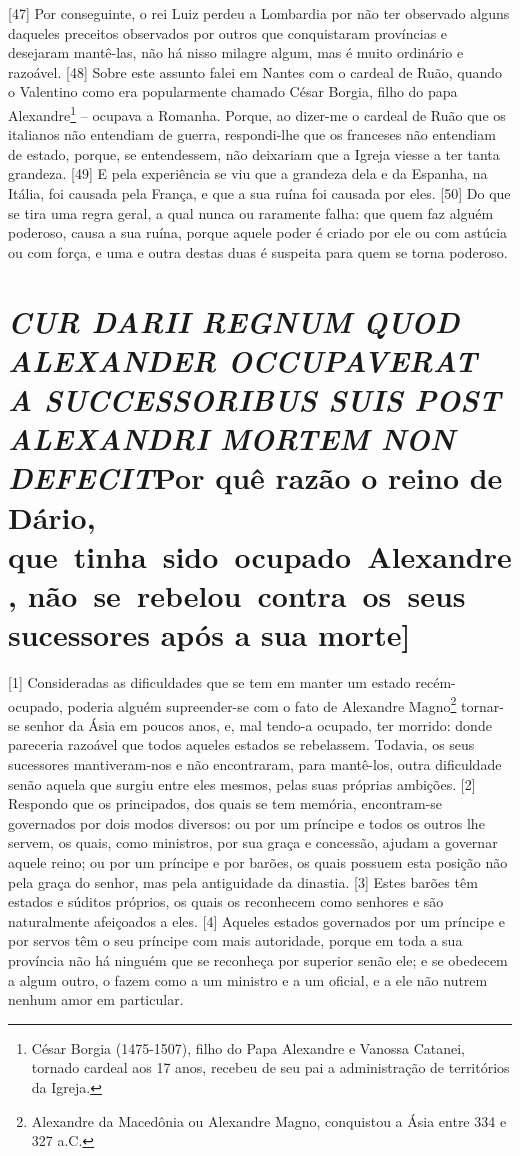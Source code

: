 {[}47{]} Por conseguinte, o rei Luiz perdeu a Lombardia por não ter
observado alguns daqueles preceitos observados por outros que
conquistaram províncias e desejaram mantê-las, não há nisso milagre
algum, mas é muito ordinário e razoável. {[}48{]} Sobre este assunto
falei em Nantes com o cardeal de Ruão, quando o Valentino como era
popularmente chamado César Borgia, filho do papa Alexandre\footnote{César
  Borgia (1475-1507), filho do Papa Alexandre  e Vanossa Catanei,
  tornado cardeal aos 17 anos, recebeu de seu pai a administração de
  territórios da Igreja.} -- ocupava a Romanha. Porque, ao dizer-me o
cardeal de Ruão que os italianos não entendiam de guerra, respondi-lhe
que os franceses não entendiam de estado, porque, se entendessem, não
deixariam que a Igreja viesse a ter tanta grandeza. {[}49{]} E pela
experiência se viu que a grandeza dela e da Espanha, na Itália, foi
causada pela França, e que a sua ruína foi causada por eles. {[}50{]} Do
que se tira uma regra geral, a qual nunca ou raramente falha: que quem
faz alguém poderoso, causa a sua ruína, porque aquele poder é criado por
ele ou com astúcia ou com força, e uma e outra destas duas é suspeita
para quem se torna poderoso.

\quebra\section{\emph{CUR DARII REGNUM QUOD ALEXANDER OCCUPAVERAT A SUCCESSORIBUS SUIS
POST ALEXANDRI MORTEM NON DEFECIT}\break {[}Por quê razão o reino de Dário, que~tinha~sido~ocupado~Alexandre, não~se~rebelou~contra~os~seus sucessores após a sua morte{]}}

{[}1{]} Consideradas as dificuldades que se tem em manter um estado
recém- ocupado, poderia alguém supreender-se com o fato de Alexandre
Magno\footnote{Alexandre da Macedônia ou Alexandre Magno, conquistou a
  Ásia entre 334 e 327 a.C.} tornar-se senhor da Ásia em poucos anos, e,
mal tendo-a ocupado, ter morrido: donde pareceria razoável que todos
aqueles estados se rebelassem. Todavia, os seus sucessores
mantiveram-nos e não encontraram, para mantê-los, outra dificuldade
senão aquela que surgiu entre eles mesmos, pelas suas próprias ambições.
{[}2{]} Respondo que os principados, dos quais se tem memória,
encontram-se governados por dois modos diversos: ou por um príncipe e
todos os outros lhe servem, os quais, como ministros, por sua graça e
concessão, ajudam a governar aquele reino; ou por um príncipe e por
barões, os quais possuem esta posição não pela graça do senhor, mas pela
antiguidade da dinastia. {[}3{]} Estes barões têm estados e súditos
próprios, os quais os reconhecem como senhores e são naturalmente
afeiçoados a eles. {[}4{]} Aqueles estados governados por um príncipe e
por servos têm o seu príncipe com mais autoridade, porque em toda a sua
província não há ninguém que se reconheça por superior senão ele; e se
obedecem a algum outro, o fazem como a um ministro e a um oficial, e a
ele não nutrem nenhum amor em particular.

